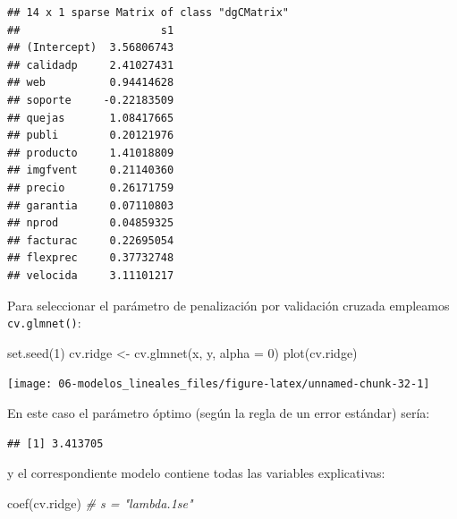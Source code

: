 \documentclass[
  spanish,
]{book}
\newenvironment{Shaded}{\begin{snugshade}}{\end{snugshade}}
\newcommand{\AttributeTok}[1]{\textcolor[rgb]{0.77,0.63,0.00}{#1}}
\newcommand{\CommentTok}[1]{\textcolor[rgb]{0.56,0.35,0.01}{\textit{#1}}}
\newcommand{\DecValTok}[1]{\textcolor[rgb]{0.00,0.00,0.81}{#1}}
\newcommand{\FloatTok}[1]{\textcolor[rgb]{0.00,0.00,0.81}{#1}}
\newcommand{\FunctionTok}[1]{\textcolor[rgb]{0.00,0.00,0.00}{#1}}
\newcommand{\NormalTok}[1]{#1}
\newcommand{\OtherTok}[1]{\textcolor[rgb]{0.56,0.35,0.01}{#1}}
\newcommand{\SpecialCharTok}[1]{\textcolor[rgb]{0.00,0.00,0.00}{#1}}
\theoremstyle{break}
\theoremstyle{definition}
\theoremstyle{definition}
\theoremstyle{definition}
\theoremstyle{definition}
\theoremstyle{remark}
\begin{document}
\begin{verbatim}
## 14 x 1 sparse Matrix of class "dgCMatrix"
##                      s1
## (Intercept)  3.56806743
## calidadp     2.41027431
## web          0.94414628
## soporte     -0.22183509
## quejas       1.08417665
## publi        0.20121976
## producto     1.41018809
## imgfvent     0.21140360
## precio       0.26171759
## garantia     0.07110803
## nprod        0.04859325
## facturac     0.22695054
## flexprec     0.37732748
## velocida     3.11101217
\end{verbatim}

Para seleccionar el parámetro de penalización por validación cruzada empleamos \texttt{cv.glmnet()}:

\begin{Shaded}
\begin{Highlighting}[]
\FunctionTok{set.seed}\NormalTok{(}\DecValTok{1}\NormalTok{)}
\NormalTok{cv.ridge }\OtherTok{\textless{}{-}} \FunctionTok{cv.glmnet}\NormalTok{(x, y, }\AttributeTok{alpha =} \DecValTok{0}\NormalTok{)}
\FunctionTok{plot}\NormalTok{(cv.ridge)}
\end{Highlighting}
\end{Shaded}

\begin{center}\texttt{[image: 06-modelos\_lineales\_files/figure-latex/unnamed-chunk-32-1]} \end{center}

En este caso el parámetro óptimo (según la regla de un error estándar) sería:

\begin{Shaded}
\end{Shaded}

\begin{verbatim}
## [1] 3.413705
\end{verbatim}

\begin{Shaded}
\end{Shaded}

y el correspondiente modelo contiene todas las variables explicativas:

\begin{Shaded}
\begin{Highlighting}[]
\FunctionTok{coef}\NormalTok{(cv.ridge) }\CommentTok{\# s = "lambda.1se"}
\end{Highlighting}
\end{Shaded}
\end{document}
